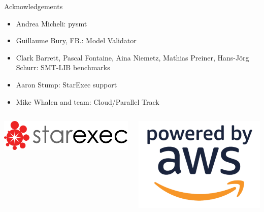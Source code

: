 \documentclass[table]{beamer}
\def\emph#1{\textcolor{MYblue}{#1}}
\begin{document}
\begin{frame}{Acknowledgements}
  \begin{itemize}
    \item \emph{Andrea Micheli}: pysmt
    \item \emph{Guillaume Bury, FB.}: Model Validator
    \item \emph{Clark Barrett, Pascal Fontaine, Aina Niemetz, Mathias Preiner, Hans-Jörg Schurr}: SMT-LIB benchmarks
    \item \emph{Aaron Stump}: StarExec support
    \item \emph{Mike Whalen and team}: Cloud/Parallel Track
  \end{itemize}
  \bigskip

  \begin{columns}
    \begin{column}{.3\textwidth}
      \includegraphics[width=\textwidth]{starlogo}
    \end{column}
    \begin{column}{.17\textwidth}
      \includegraphics[width=\textwidth]{powered-by-aws}
    \end{column}
  \end{columns}
\end{frame}
\end{document}
